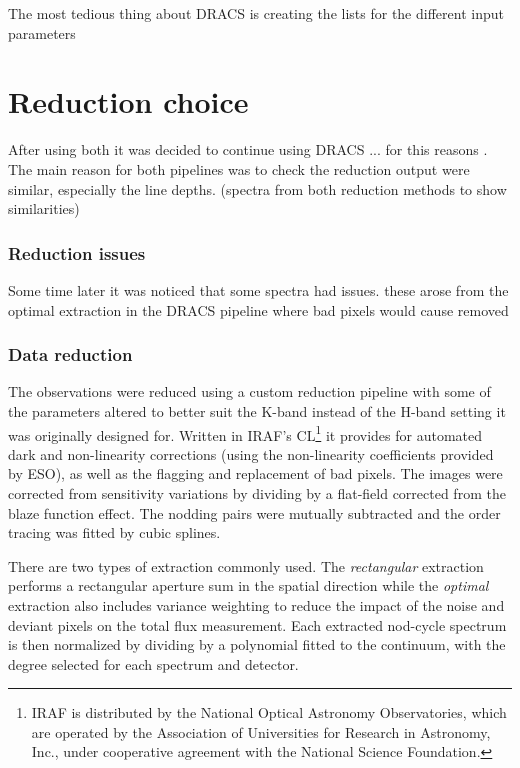 The most tedious thing about DRACS is creating the lists for the different input parameters




\section{Reduction choice }

After using both it was decided to continue using DRACS ... for this reasons
. 
The main reason for both pipelines was to check the reduction output were similar, especially the line depths.
\missingfigure(spectra from both reduction methods to show similarities)


\subsubsection{Reduction issues}

Some time later it was noticed that some spectra had issues. these arose from the optimal extraction in the DRACS pipeline where bad pixels would cause removed


\subsubsection{Data reduction}
\label{subsubsec:reduction}
The observations were reduced using a custom reduction pipeline \citep{figueira_radial_2010} with some of the parameters altered to better suit the K-band instead of the H-band setting it was originally designed for. Written in IRAF's CL\footnote{IRAF is distributed by the National Optical Astronomy Observatories, which are operated by the Association of Universities for Research in Astronomy, {Inc.}, under cooperative agreement with the National Science Foundation.} \citep{tody_iraf_1993} it provides for automated dark and non-linearity corrections (using the non-linearity coefficients provided by ESO), as well as the flagging and replacement of bad pixels. The images were corrected from sensitivity variations by dividing by a flat-field corrected from the blaze function effect. The nodding pairs were mutually subtracted and the order tracing was fitted by cubic splines.  

There are two types of extraction commonly used. The \emph{rectangular} extraction performs a rectangular aperture sum in the spatial direction while the \emph{optimal} extraction \citep{horne_optimal_1986} also includes variance weighting to reduce the impact of the noise and deviant pixels on the total flux measurement. Each extracted nod-cycle spectrum is then normalized by dividing by a polynomial fitted to the continuum, with the degree selected for each spectrum and detector.


